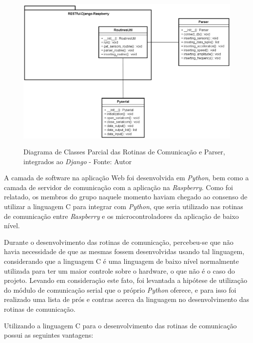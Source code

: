 \begin{figure}[H]
\centering
\includegraphics[keepaspectratio=true,scale=0.65]{figuras/uml_routines_parser.png}
\label{fig:uml_routines_parser}
\caption{Diagrama de Classes Parcial das Rotinas de Comunicação e Parser, integrados ao \textit{Django} - Fonte: Autor}
\end{figure}



A camada de software na aplicação Web foi desenvolvida em \textit{Python}, bem como a camada de servidor de comunicação com a aplicação na 
\textit{Raspberry}. Como foi relatado, os membros do grupo naquele momento haviam chegado ao consenso de utilizar a linguagem C para integrar 
com \textit{Python}, que seria utilizado nas rotinas de comunicação entre \textit{Raspberry} e os microcontroladores da aplicação de baixo nível.

Durante o desenvolvimento das rotinas de comunicação, percebeu-se que não havia necessidade de que as mesmas fossem desenvolvidas 
usando tal linguagem, considerando que a linguagem C é uma linguagem de baixo nível normalmente utilizada para ter um maior controle sobre o 
hardware, o que não é o caso do projeto. Levando em consideração este fato, foi levantada a hipótese de utilização do módulo de comunicação serial que o próprio 
\textit{Python} oferece, e para isso foi realizado uma lista de prós e contras acerca da linguagem no desenvolvimento das rotinas de comunicação.

Utilizando a linguagem C para o desenvolvimento das rotinas de comunicação possui as seguintes vantagens:

